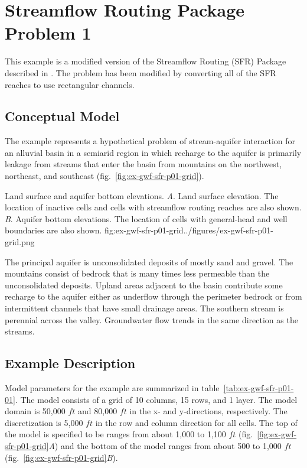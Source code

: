 \section{Streamflow Routing Package Problem 1}

This example is a modified version of the Streamflow Routing (SFR) Package described in \cite{modflowsfr1pack}. The problem has been modified by converting all of the SFR reaches to use rectangular channels.                               

\subsection{Conceptual Model}

The example represents a hypothetical problem of stream-aquifer interaction for an alluvial basin in a semiarid region in which recharge to the aquifer is primarily leakage from streams that enter the basin from mountains on the northwest, northeast, and southeast (fig.~\ref{fig:ex-gwf-sfr-p01-grid}).

\begin{StandardFigure}{
                                     Land surface and aquifer bottom elevations. 
                                     \textit{A}. Land surface elevation. The location of inactive cells 
                                     and cells with streamflow routing reaches are also shown.
                                     \textit{B}. Aquifer bottom elevations. The location of cells with 
                                     general-head and well boundaries are also shown.
                                     }{fig:ex-gwf-sfr-p01-grid}{../figures/ex-gwf-sfr-p01-grid.png}
\end{StandardFigure}   

The principal aquifer is unconsolidated deposits of mostly sand and gravel. The mountains consist of bedrock that is many times less permeable than the unconsolidated deposits. Upland areas adjacent to the basin contribute some recharge to the aquifer either as underflow through the perimeter bedrock or from intermittent channels that have small drainage areas. The southern stream is perennial across the valley. Groundwater flow trends in the same direction as the streams.


\subsection{Example Description}
Model parameters for the example are summarized in table~\ref{tab:ex-gwf-sfr-p01-01}.  The model consists of a grid of 10 columns, 15 rows, and 1 layer. The model domain is  50,000 $ft$ and 80,000 $ft$ in the x- and y-directions, respectively. The discretization is 5,000 $ft$ in the row and column direction for all cells. The top of the model is specified to be ranges from about 1,000 to 1,100 $ft$ (fig.~\ref{fig:ex-gwf-sfr-p01-grid}\textit{A}) and the bottom of the model ranges from about 500 to 1,000 $ft$ (fig.~\ref{fig:ex-gwf-sfr-p01-grid}\textit{B}).

